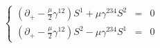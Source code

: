 \begin{equation}
\left\{
\begin{array}{rcl}
\left( \partial_+ - \frac{\mu}{2} \gamma^{12} \right) S^1 +  \mu \gamma^{234} S^2 &=& 0 \\
\left( \partial_+ - \frac{\mu}{2} \gamma^{12} \right) S^2 -  \mu \gamma^{234} S^1 &=& 0
\end{array}
\right.
\end{equation} 
